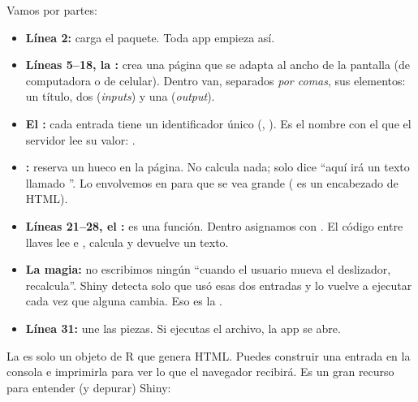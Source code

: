 Vamos por partes:

\begin{itemize}
  \item \textbf{Línea 2:}  carga el paquete. Toda app
        empieza así.
  \item \textbf{Líneas 5--18, la :}  crea una
        página que se adapta al ancho de la pantalla (de computadora o de
        celular). Dentro van, separados \emph{por comas}, sus elementos: un
        título, dos  (\emph{inputs}) y una
         (\emph{output}).
  \item \textbf{El :} cada entrada tiene un identificador
        único (, ). Es el nombre con el
        que el servidor lee su valor: .
  \item \textbf{:} reserva un hueco en
        la página. No calcula nada; solo dice ``aquí irá un texto llamado
        ''. Lo envolvemos en  para que se
        vea grande ( es un encabezado de HTML).
  \item \textbf{Líneas 21--28, el :} es una función. Dentro
        asignamos  con .
        El código entre llaves lee  e
        , calcula y devuelve un texto.
  \item \textbf{La magia:} no escribimos ningún ``cuando el usuario mueva el
        deslizador, recalcula''. Shiny detecta solo que
         usó esas dos entradas y lo vuelve a ejecutar
        cada vez que alguna cambia. Eso es la .
  \item \textbf{Línea 31:}  une las piezas. Si ejecutas
        el archivo, la app se abre.
\end{itemize}

La  es solo un objeto de R que genera HTML. Puedes construir una
entrada en la consola e imprimirla para ver lo que el navegador recibirá.
Es un gran recurso para entender (y depurar) Shiny:


